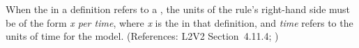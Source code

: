 When the  in a \RateRule definition refers to a \Parameter,
the units of the rule's right-hand side must be of the form \emph{x per
time}, where \emph{x} is the  in that \Parameter definition,
and \emph{time} refers to the units of time for the model.  (References:
L2V2 Section~4.11.4; )
